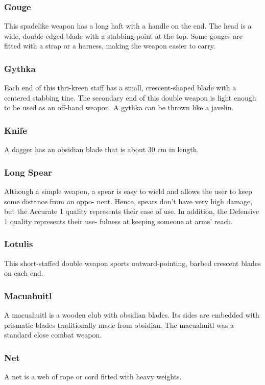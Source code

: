 \begin{multicols}{2}
\subsubsection{Gouge}
\label{itmmlee:gouge}
This spadelike weapon has a long haft with a handle on the end. The head
is a wide, double-edged blade with a stabbing point at the top. Some
gouges are fitted with a strap or a harness, making the weapon easier
to carry.

\subsubsection{Gythka}
\label{itmmlee:gythka}
Each end of this thri-kreen staff has a
small, crescent-shaped blade with a centered stabbing
tine. The secondary end of this double weapon is light
enough to be used as an off-hand weapon. A gythka
can be thrown like a javelin.

\subsubsection{Knife}
\label{itmmlee:knife}
A dagger has an obsidian blade that is about 30 cm in length.

\subsubsection{Long Spear}
\label{itmmlee:longspear}
Although a simple weapon, a spear is easy to wield and
allows the user to keep some distance from an oppo-
nent. Hence, spears don’t have very high damage, but
the Accurate 1 quality represents their ease of use. In
addition, the Defensive 1 quality represents their use-
fulness at keeping someone at arms’ reach.

\subsubsection{Lotulis}
\label{itmmlee:lotulis}
This short-staffed double weapon sports outward-pointing,
barbed crescent blades on each end.

\subsubsection{Macuahuitl}
\label{itmmlee:macuahuitl}
A macuahuitl is a wooden club with obsidian blades. Its sides
are embedded with prismatic blades traditionally made from
obsidian. The macuahuitl was a standard close combat weapon.

\subsubsection{Net}
\label{itmmlee:net}
A net is a web of rope or cord fitted with heavy weights.


\end{multicols}
